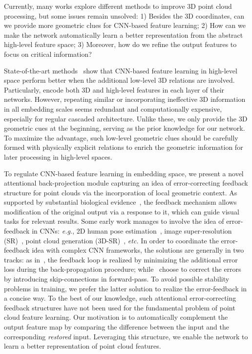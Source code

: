 \documentclass[journal,twoside]{IEEEtran}
\newcommand{\latinphrase}[1]{\textit{#1}}
\newcommand{\eg}{\latinphrase{e.g.}\xspace}
\newcommand{\etc}{\latinphrase{etc.}\xspace}
\begin{document}
Currently, many works explore different methods to improve 3D point cloud processing, but some issues remain unsolved: 1) Besides the 3D coordinates, can we provide more geometric clues for CNN-based feature learning; 2) How can we make the network automatically learn a better representation from the abstract high-level feature space; 3) Moreover, how do we refine the output features to focus on critical information?

State-of-the-art methods~\cite{liu2019relation,wang2017cnn,xu2018spidercnn,li2018so,Hu_2020_CVPR} show that CNN-based feature learning in high-level space perform better when the additional low-level 3D relations are involved. Particularly, \cite{liu2019relation, Hu_2020_CVPR} encode both 3D and high-level features in each layer of their networks. However, repeating similar or incorporating ineffective 3D information in all embedding scales seems redundant and computationally expensive, especially for regular cascaded architecture. Unlike these, we only provide the 3D geometric cues at the beginning, serving as the prior knowledge for our network. To maximize the advantage, such low-level geometric clues should be carefully formed with physically explicit relations to enrich the geometric information for later processing in high-level spaces.

To regulate CNN-based feature learning in embedding space, we present a novel attentional back-projection module capturing an idea of error-correcting feedback structure for point clouds via the incorporation of local geometric context. As supported by substantial biological evidence~\cite{weiss1987dynamic,kitano2002computational}, the feedback mechanism allows modification of the original output via a response to it, which can guide visual tasks for relevant results. Some early work manages to involve the idea of error-feedback in CNNs: \eg, 2D human pose estimation~\cite{carreira2016human}, image super-resolution (SR)~\cite{haris2018deep,liu2019hierarchical}, point cloud generation (3D-SR)~\cite{Li_2019_ICCV}, \etc In order to coordinate the error-feedback idea with complex CNN frameworks, the solutions are generally in two tracks: as in~\cite{carreira2016human}, the feedback loop is realized by minimizing the additional error loss during the back-propagation procedure; while~\cite{haris2018deep, liu2019hierarchical, Li_2019_ICCV} choose to correct the errors by introducing skip-connections in forward-pass. To avoid possible stability problems in training, we prefer the latter solution to realize the error-feedback in a concise way. To the best of our knowledge, such attentional error-correcting feedback structures have not been used for the fundamental problem of point cloud feature learning. Our motivation is to automatically complement the output feature map by comparing the difference between the input and the corresponding \emph{restored} input. Leveraging this structure, we enable the network to learn a better representation of point cloud features.
\end{document}
